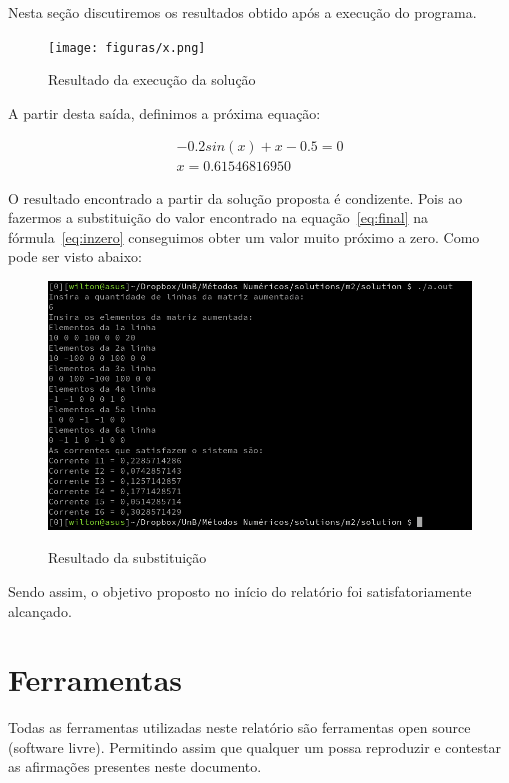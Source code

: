 \documentclass[12pt, hidelinks]{article}
\begin{document}
Nesta seção discutiremos os resultados obtido após a execução do programa.

\begin{figure}[!h]
  \centering
  \texttt{[image: figuras/x.png]}\\
  \caption{Resultado da execução da solução}\label{fig:valx}
\end{figure}

A partir desta saída, definimos a próxima equação:

\begin{eqnarray}\label{eq:final}
  -0.2sin(x) + x - 0.5 = 0 \nonumber\\
  x = 0.61546816950
\end{eqnarray}

O resultado encontrado a partir da solução proposta é condizente. Pois ao fazermos a substituição do valor
encontrado na equação~\eqref{eq:final} na fórmula~\eqref{eq:inzero} conseguimos obter um valor muito próximo a zero.
Como pode ser visto abaixo:

\begin{figure}[!h]
  \centering
  \includegraphics[width=15cm]{figuras/printx.png}\\
  \caption{Resultado da substituição}\label{fig:printx}
\end{figure}

Sendo assim, o objetivo proposto no início do relatório foi satisfatoriamente alcançado.

\newpage
\section{Ferramentas}
Todas as ferramentas utilizadas neste relatório são ferramentas open source (software livre).
Permitindo assim que qualquer um possa reproduzir e contestar as afirmações presentes neste documento.
\end{document}
